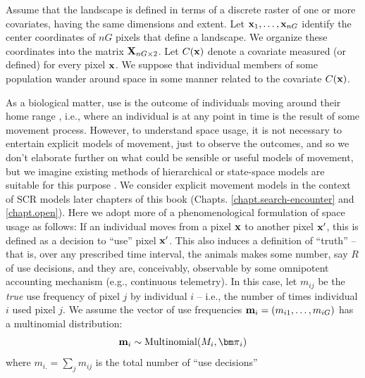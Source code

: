 Assume that the landscape is defined in terms of a discrete raster of
one or more covariates, having the same dimensions and extent.  Let
${\bf x}_{1},\ldots,{\bf x}_{nG}$ identify the center coordinates of
$nG$ pixels that define a landscape.  We organize these coordinates
into the matrix ${\bf X}_{nG \times 2}$.  Let $C({\bf x})$ denote a
covariate measured (or defined) for every pixel ${\bf x}$.  We suppose
that individual members of some population wander around space in some
manner related to the covariate $C({\bf x})$.

As a biological matter, use is the outcome of individuals moving
around their home range \citep{hooten_etal:2010}, i.e., where an
individual is at any point in time is the result of some movement
process. However, to understand space usage, it is not necessary to
entertain explicit models of movement, just to observe the outcomes,
and so we don't elaborate further on what could be sensible or useful
models of movement, but we imagine existing methods of hierarchical or
state-space models are suitable for this purpose
\citep{ovaskainen:2004, jonsen_etal:2005, forester_etal:2007,
  ovaskainen_etal:2008, patterson_etal:2008, hooten_etal:2010,
  mcclintock_etal:2012}.  We consider explicit movement models in the
context of SCR models later chapters of this book
(Chapts. \ref{chapt.search-encounter} and \ref{chapt.open}).  Here we
adopt more of a phenomenological formulation of space usage as
follows: If an individual moves from a pixel ${\bf x}$ to another
pixel ${\bf x}'$, this is defined as a decision to ``use'' pixel ${\bf
  x}'$. This also induces a definition of ``truth'' -- that is, over
any prescribed time interval, the animals makes some number, say $R$
of use decisions, and they are, conceivably, observable by some
omnipotent accounting mechanism (e.g., continuous telemetry).  
In this
case, let $m_{ij}$ be the {\it true} use frequency of pixel $j$ by
individual $i$ -- i.e., the number of times individual $i$ used pixel
$j$.  We assume the vector of use frequencies ${\bf m}_{i} =
(m_{i1},\ldots,m_{iG})$ has a multinomial distribution:
\[
{\bf m}_{i} \sim \mbox{Multinomial}(M_{i}, {\bm \pi}_{i})
\]
where $m_{i.} = \sum_{j} m_{ij}$ is the total number of ``use decisions''
